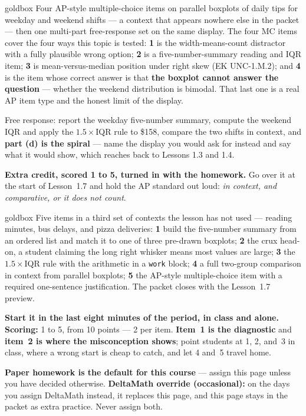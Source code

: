 \documentclass[10pt]{article}
\begin{document}
\boxguard
\begin{skillbox}{goldbox}
Four AP-style multiple-choice items on parallel boxplots of daily tips for weekday and weekend
shifts --- a context that appears nowhere else in the packet --- then one multi-part free-response
set on the same display. The four MC items cover the four ways this topic is tested: \textbf{1} is
the width-means-count distractor with a fully plausible wrong option; \textbf{2} is a
five-number-summary reading and IQR item; \textbf{3} is mean-versus-median position under right
skew (EK UNC-1.M.2); and \textbf{4} is the item whose correct answer is that \textbf{the boxplot
cannot answer the question} --- whether the weekend distribution is bimodal. That last one is a
real AP item type and the honest limit of the display.

Free response: report the weekday five-number summary, compute the weekend IQR and apply the
$1.5\times$IQR rule to \$158, compare the two shifts in context, and \textbf{part (d) is the
spiral} --- name the display you would ask for instead and say what it would show, which reaches
back to Lessons 1.3 and 1.4.

\textbf{Extra credit, scored 1 to 5, turned in with the homework.} Go over it at
the start of Lesson~1.7 and hold the AP standard out loud: \emph{in context, and comparative, or
it does not count}.
\end{skillbox}

\boxguard
\begin{skillbox}{goldbox}
Five items in a third set of contexts the lesson has not used --- reading minutes, bus delays,
and pizza deliveries: \textbf{1} build the five-number summary from an ordered list and match it
to one of three pre-drawn boxplots; \textbf{2} the crux head-on, a student claiming the long
right whisker means most values are large; \textbf{3} the $1.5\times$IQR rule with the arithmetic
in a \texttt{work} block; \textbf{4} a full two-group comparison in context from parallel
boxplots; \textbf{5} the AP-style multiple-choice item with a required one-sentence
justification. The packet closes with the Lesson~1.7 preview.

\textbf{Start it in the last eight minutes of the period, in class and alone.} \textbf{Scoring:}
1 to 5, from 10 points --- 2 per item. \textbf{Item~1 is the diagnostic} and \textbf{item~2 is where the
misconception shows}; point students at 1, 2, and~3 in class, where a wrong start is cheap to
catch, and let 4 and~5 travel home.

\textbf{Paper homework is the default for this course} --- assign this page unless you have
decided otherwise. \textbf{DeltaMath override (occasional):} on the days you assign DeltaMath
instead, it replaces this page, and this page
stays in the packet as extra practice. Never assign both.
\end{skillbox}
\end{document}

